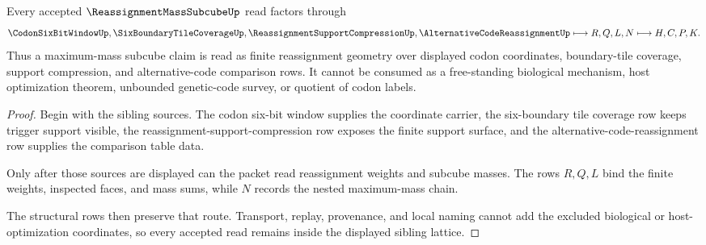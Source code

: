 \begin{theorem}
\label{thm:reassignment-mass-subcube-sibling-route}
Every accepted $\ReassignmentMassSubcubeUp$ read factors through
$$
\CodonSixBitWindowUp,\SixBoundaryTileCoverageUp,\ReassignmentSupportCompressionUp,\AlternativeCodeReassignmentUp
\longmapsto
R,Q,L,N
\longmapsto
H,C,P,K .
$$
Thus a maximum-mass subcube claim is read as finite reassignment geometry over displayed codon coordinates, boundary-tile coverage, support compression, and alternative-code comparison rows. It cannot be consumed as a free-standing biological mechanism, host optimization theorem, unbounded genetic-code survey, or quotient of codon labels.
\end{theorem}
\begin{proof}
Begin with the sibling sources. The codon six-bit window supplies the coordinate carrier, the six-boundary tile coverage row keeps trigger support visible, the reassignment-support-compression row exposes the finite support surface, and the alternative-code-reassignment row supplies the comparison table data.

Only after those sources are displayed can the packet read reassignment weights and subcube masses. The rows $R,Q,L$ bind the finite weights, inspected faces, and mass sums, while $N$ records the nested maximum-mass chain.

The structural rows then preserve that route. Transport, replay, provenance, and local naming cannot add the excluded biological or host-optimization coordinates, so every accepted read remains inside the displayed sibling lattice.
\end{proof}



